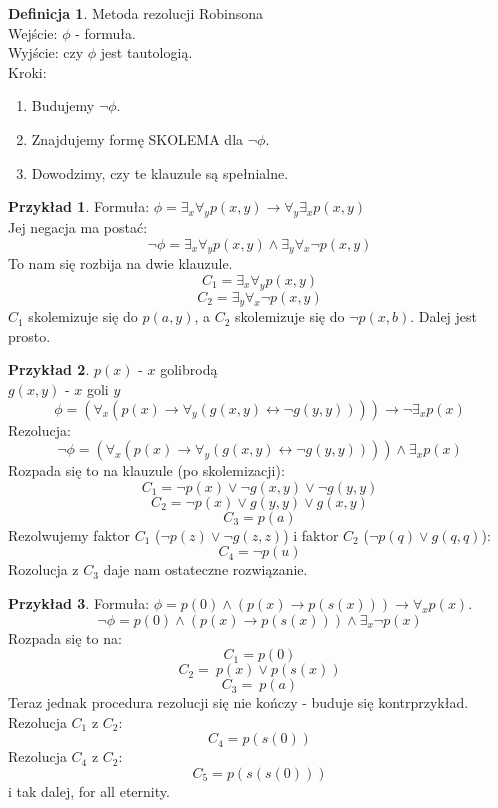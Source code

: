 \documentclass[10pt,a4paper]{article}
\theoremstyle{plain}
\theoremstyle{definition}
\newtheorem*{definition}{Definicja}
\newtheorem*{example}{Przykład}
\begin{document}
\begin{definition}
 Metoda rezolucji Robinsona\\
Wejście: $\phi$ - formuła.\\
Wyjście: czy $\phi$ jest tautologią.\\
Kroki:
\begin{enumerate}
 \item Budujemy $\lnot \phi$.
 \item Znajdujemy formę SKOLEMA dla $\lnot \phi$.
 \item Dowodzimy, czy te klauzule są spełnialne.
\end{enumerate}
\end{definition}
\begin{example}
 Formuła: $\phi = \exists_x \forall_y p(x,y) \to \forall_y \exists_x p(x,y)$\\
Jej negacja ma postać:
$$\lnot \phi = \exists_x \forall_y p(x,y) \wedge \exists_y \forall_x \lnot p(x,y)$$
To nam się rozbija na dwie klauzule.
$$C_1 = \exists_x \forall_y p(x,y)$$
$$C_2 = \exists_y \forall_x \lnot p(x,y)$$
$C_1$ skolemizuje się do $p(a, y)$, a $C_2$ skolemizuje się do $\lnot p(x, b)$.
Dalej jest prosto.
\end{example}
\begin{example}
$p(x)$ - $x$ golibrodą\\
$g(x,y)$ - $x$ goli $y$\\
$$\phi = (\forall_x (p(x) \to \forall_y(g(x,y) \leftrightarrow \lnot g(y,y)))) \to \lnot \exists_x p(x)$$
Rezolucja:
$$\lnot \phi = (\forall_x (p(x) \to \forall_y(g(x,y) \leftrightarrow \lnot g(y,y)))) \wedge \exists_x p(x)$$
Rozpada się to na klauzule (po skolemizacji):
$$C_1 = \lnot p(x) \vee \lnot g(x,y) \vee \lnot g(y,y)$$
$$C_2 = \lnot p(x) \vee g(y,y) \vee g(x,y)$$
$$C_3 = p(a)$$
Rezolwujemy faktor $C_1$ ($\lnot p(z) \vee \lnot g(z,z)$) i faktor $C_2$ ($\lnot p(q) \vee g(q,q)$):
$$C_4 = \lnot p(u)$$
Rozolucja z $C_3$ daje nam ostateczne rozwiązanie.
\end{example}
\begin{example}
Formuła: $\phi = p(0) \wedge (p(x) \to p(s(x))) \to \forall_x p(x)$.
$$\lnot \phi = p(0) \wedge (p(x) \to p(s(x))) \wedge \exists_x \lnot p(x)$$
Rozpada się to na:
$$C_1 = p(0)$$
$$C_2 = ~p(x) \vee p(s(x))$$
$$C_3 = ~p(a)$$
Teraz jednak procedura rezolucji się nie kończy - buduje się kontrprzykład.\\
Rezolucja $C_1$ z $C_2$:
$$C_4 = p(s(0))$$
Rezolucja $C_4$ z $C_2$:
$$C_5 = p(s(s(0)))$$
i tak dalej, for all eternity.
\end{example}
\end{document}
